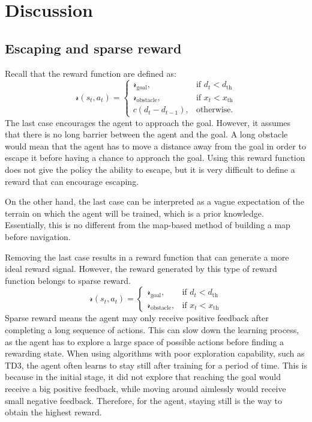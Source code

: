 \section{Discussion} \label{sec:discussion}

\subsection{Escaping and sparse reward}

Recall that the reward function are defined as:
\begin{equation*}
    \mathcal{r}(s_t, a_t) = \begin{cases}
    \mathcal{r}_\text{goal}, &\text{if $d_t < d_\text{th}$}\\
    \mathcal{r}_\text{obstacle}, &\text{if $x_t < x_\text{th}$}\\
    c (d_t - d_{t-1}), &\text{otherwise.}
    \end{cases}
\end{equation*}
The last case encourages the agent to approach the goal. However, it assumes that there is no long barrier between the agent and the goal. A long obstacle would mean that the agent has to move a distance away from the goal in order to escape it before having a chance to approach the goal. Using this reward function does not give the policy the ability to escape, but it is very difficult to define a reward that can encourage escaping.

On the other hand, the last case can be interpreted as a vague expectation of the terrain on which the agent will be trained, which is a prior knowledge. Essentially, this is no different from the map-based method of building a map before navigation.

Removing the last case results in a reward function that can generate a more ideal reward signal. However, the reward generated by this type of reward function belongs to sparse reward.
\begin{equation*}
    \mathcal{r}(s_t, a_t) = \begin{cases}
    \mathcal{r}_\text{goal}, &\text{if $d_t < d_\text{th}$}\\
    \mathcal{r}_\text{obstacle}, &\text{if $x_t < x_\text{th}$}
    \end{cases}
\end{equation*}
Sparse reward means the agent may only receive positive feedback after completing a long sequence of actions. This can slow down the learning process, as the agent has to explore a large space of possible actions before finding a rewarding state. When using algorithms with poor exploration capability, such as TD3, the agent often learns to stay still after training for a period of time. This is because in the initial stage, it did not explore that reaching the goal would receive a big positive feedback, while moving around aimlessly would receive small negative feedback. Therefore, for the agent, staying still is the way to obtain the highest reward.

